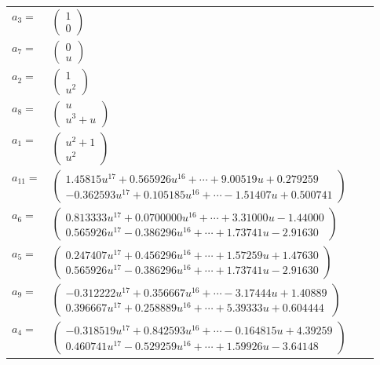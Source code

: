 \documentclass[1p]{elsarticle_modified}
\theoremstyle{definition}
\begin{document}
\begin{tabular}{m{7pt} m{180pt} m{7pt} m{180pt} }
\flushright $a_{3}=$&$\begin{pmatrix}1\\0\end{pmatrix}$ \\
\flushright $a_{7}=$&$\begin{pmatrix}0\\u\end{pmatrix}$ \\
\flushright $a_{2}=$&$\begin{pmatrix}1\\u^2\end{pmatrix}$ \\
\flushright $a_{8}=$&$\begin{pmatrix}u\\u^3+u\end{pmatrix}$ \\
\flushright $a_{1}=$&$\begin{pmatrix}u^2+1\\u^2\end{pmatrix}$ \\
\flushright $a_{11}=$&$\begin{pmatrix}1.45815 u^{17}+0.565926 u^{16}+\cdots+9.00519 u+0.279259\\-0.362593 u^{17}+0.105185 u^{16}+\cdots-1.51407 u+0.500741\end{pmatrix}$ \\
\flushright $a_{6}=$&$\begin{pmatrix}0.813333 u^{17}+0.0700000 u^{16}+\cdots+3.31000 u-1.44000\\0.565926 u^{17}-0.386296 u^{16}+\cdots+1.73741 u-2.91630\end{pmatrix}$ \\
\flushright $a_{5}=$&$\begin{pmatrix}0.247407 u^{17}+0.456296 u^{16}+\cdots+1.57259 u+1.47630\\0.565926 u^{17}-0.386296 u^{16}+\cdots+1.73741 u-2.91630\end{pmatrix}$ \\
\flushright $a_{9}=$&$\begin{pmatrix}-0.312222 u^{17}+0.356667 u^{16}+\cdots-3.17444 u+1.40889\\0.396667 u^{17}+0.258889 u^{16}+\cdots+5.39333 u+0.604444\end{pmatrix}$ \\
\flushright $a_{4}=$&$\begin{pmatrix}-0.318519 u^{17}+0.842593 u^{16}+\cdots-0.164815 u+4.39259\\0.460741 u^{17}-0.529259 u^{16}+\cdots+1.59926 u-3.64148\end{pmatrix}$ \\

\end{tabular}
\end{document}
